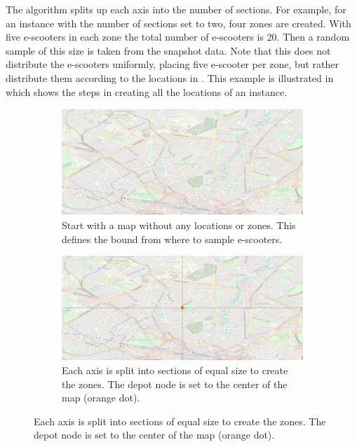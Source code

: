 The algorithm splits up each axis into the number of sections. For example, for an instance with the number of sections set to two, four zones are created. With five e-scooters in each zone the total number of e-scooters is 20. Then a random sample of this size is taken from the snapshot data. Note that this does not distribute the e-scooters uniformly, placing five e-scooter per zone, but rather distribute them according to the locations in . This example is illustrated in  which shows the steps in creating all the locations of an instance.
\\
\begin{figure}[h]
     \centering
     \begin{subfigure}{0.49\textwidth}
         \centering
         \includegraphics[width=\textwidth]{Images/empty_map.png}
         \caption{Start with a map without any locations or zones. This defines the bound from where to sample e-scooters.}
         \label{fig:instance_example:empty}
     \end{subfigure}
     \hfill
     \begin{subfigure}{0.49\textwidth}
         \centering
         \includegraphics[width=\textwidth]{Images/map_only_zones.png}
         \caption{Each axis is split into sections of equal size to create the zones. The depot node is set to the center of the map (orange dot).}
         \label{fig:instance_example:only_zones}

\end{subfigure}
\end{figure}
